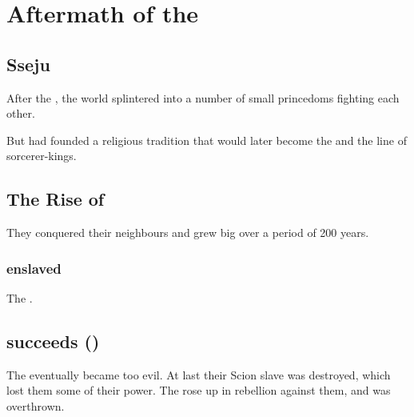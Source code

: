 \chapter{Aftermath of the \HundredScourges}
\section{Sseju}
After the , the world splintered into a number of small princedoms fighting each other. 

But  had founded a religious tradition that would later become the  and the  line of sorcerer-kings. 













\section{The Rise of \Ortaica}
They conquered their neighbours and grew big over a period of 200 years. 









\subsection{\Ishicah{} enslaved}
The \Ortaican{} \rethyaxes{} . 













\section{\Tepharae succeeds \Ortaica ()}
The \Ortaicans{} eventually became too evil. 
At last their Scion slave was destroyed, which lost them some of their power. 
The \Iquinian{}  rose up in rebellion against them, and \Ortaica{} was overthrown. 









